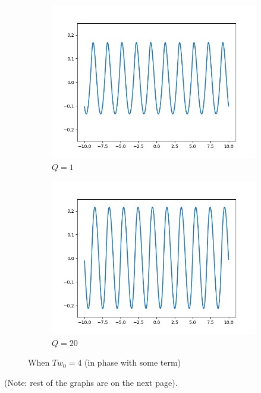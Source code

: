 \documentclass{article}
\begin{document}
\begin{figure}[h!]
    \centering
     \begin{subfigure}[b]{0.45\textwidth}
         \centering
         \includegraphics[width=\linewidth]{1,0.png}
         \caption{$Q=1$}
     \end{subfigure}
     \begin{subfigure}[b]{0.45\textwidth}
         \centering
         \includegraphics[width=\linewidth]{1,1.png}
         \caption{$Q=20$}
     \end{subfigure}
     \caption{When $Tw_0 = 4$ (in phase with some term)}
\end{figure}
(Note: rest of the graphs are on the next page).
\end{document}

